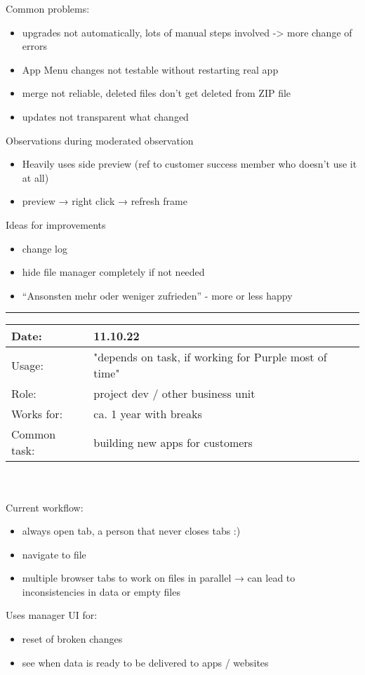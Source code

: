 Common problems:
\begin{itemize}[nosep]  
  \item upgrades not automatically, lots of manual steps involved -> more change of errors
  \item App Menu changes not testable without restarting real app
  \item merge not reliable, deleted files don't get deleted from ZIP file
  \item updates not transparent what changed
\end{itemize}


Observations during moderated observation
\begin{itemize}[nosep]  
  \item Heavily uses side preview (ref to customer success member who doesn't use it at all)
  \item preview → right click → refresh frame
\end{itemize}

Ideas for improvements
\begin{itemize}[nosep]  
  \item change log
  \item hide file manager completely if not needed
  \item “Ansonsten mehr oder weniger zufrieden” - more or less happy
\end{itemize}
\bigskip
\hrule
\begin{tabularx}{\linewidth}{lX}
  Date: & 11.10.22 \\
  \hline
  Usage: & "depends on task, if working for Purple most of time"\\
  \hline
  Role: & project dev / other business unit \\
  \hline
  Works for: & ca. 1 year with breaks \\
  \hline
  Common task: &  building new apps for customers
\end{tabularx}
\\\\
Current workflow:
\begin{itemize}[nosep]
  \item always open tab, a person that never closes tabs :)
  \item navigate to file
  \item multiple browser tabs to work on files in parallel → can lead to inconsistencies in data or empty files
\end{itemize}
Uses manager UI for:
\begin{itemize}[nosep]
  \item reset of broken changes
  \item see when data is ready to be delivered to apps / websites
\end{itemize}

